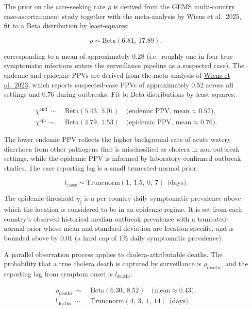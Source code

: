 \documentclass[
]{book}
\begin{document}
The prior on the care-seeking rate \(\rho\) is derived from the GEMS multi-country case-ascertainment study together with the meta-analysis by Wiens et al.~2025, fit to a Beta distribution by least-squares:

\[
\rho \sim \text{Beta}(6.81,\ 17.89),
\label{eq:rho}
\]

corresponding to a mean of approximately 0.28 (i.e.~roughly one in four true symptomatic infections enters the surveillance pipeline as a suspected case). The endemic and epidemic PPVs are derived from the meta-analysis of \href{https://journals.plos.org/plosmedicine/article?id=10.1371/journal.pmed.1004286}{Wiens et al.~2023}, which reports suspected-case PPVs of approximately 0.52 across all settings and 0.76 during outbreaks. Fit to Beta distributions by least-squares:

\[
\begin{aligned}
\chi^{\text{end}} \ \sim\ & \text{Beta}(5.43,\ 5.01) \quad \text{(endemic PPV, mean} \approx 0.52\text{)},\\
\chi^{\text{epi}} \ \sim\ & \text{Beta}(4.79,\ 1.53) \quad \text{(epidemic PPV, mean} \approx 0.76\text{)}.
\end{aligned}
\label{eq:chi-priors}
\]

The lower endemic PPV reflects the higher background rate of acute watery diarrhoea from other pathogens that is misclassified as cholera in non-outbreak settings, while the epidemic PPV is informed by laboratory-confirmed outbreak studies. The case reporting lag is a small truncated-normal prior:

\[
l_{\text{cases}} \sim \text{Truncnorm}(1,\ 1.5,\ 0,\ 7) \ \ \text{(days)}.
\label{eq:reporting-lag-cases}
\]

The epidemic threshold \(\eta_j\) is a per-country daily symptomatic prevalence above which the location is considered to be in an epidemic regime. It is set from each country's observed historical median outbreak prevalence with a truncated-normal prior whose mean and standard deviation are location-specific, and is bounded above by 0.01 (a hard cap of 1\% daily symptomatic prevalence).

A parallel observation process applies to cholera-attributable deaths. The probability that a true cholera death is captured by surveillance is \(\rho_{\text{deaths}}\), and the reporting lag from symptom onset is \(l_{\text{deaths}}\):

\[
\begin{aligned}
\rho_{\text{deaths}} \ \sim\ & \text{Beta}(6.30,\ 8.52) \quad \text{(mean} \approx 0.43\text{)},\\
l_{\text{deaths}} \ \sim\ & \text{Truncnorm}(4,\ 3,\ 1,\ 14) \ \ \text{(days)}.
\end{aligned}
\label{eq:rho-deaths}
\]
\end{document}
